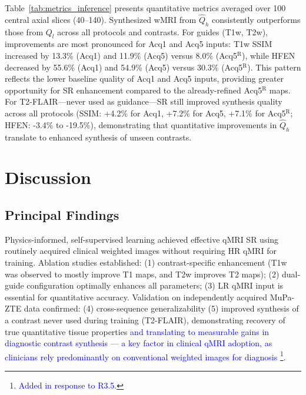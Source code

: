 \documentclass[journal,twoside,web]{ieeecolor}
\newcommand{\added}[1]{\textcolor{blue}{#1}}      %
\begin{document}
Table~\ref{tab:metrics_inference} presents quantitative metrics averaged over 100 central axial slices (40--140). Synthesized wMRI from $\hat{Q}_h$ consistently outperforms those from $Q_l$ across all protocols and contrasts. For guides (T1w, T2w), improvements are most pronounced for Acq1 and Acq5 inputs: T1w SSIM increased by 13.3\% (Acq1) and 11.9\% (Acq5) versus 8.0\% (Acq5$^{\text{R}}$), while HFEN decreased by 55.6\% (Acq1) and 54.9\% (Acq5) versus 30.3\% (Acq5$^{\text{R}}$). This pattern reflects the lower baseline quality of Acq1 and Acq5 inputs, providing greater opportunity for SR enhancement compared to the already-refined Acq5$^{\text{R}}$ maps. For T2-FLAIR—never used as guidance—SR still improved synthesis quality across all protocols (SSIM: +4.2\% for Acq1, +7.2\% for Acq5, +7.1\% for Acq5$^{\text{R}}$; HFEN: -3.4\% to -19.5\%), demonstrating that quantitative improvements in $\hat{Q}_h$ translate to enhanced synthesis of unseen contrasts.



\section{Discussion}
\subsection{ Principal Findings}
Physics-informed, self-supervised learning achieved effective qMRI SR using routinely acquired clinical weighted images without requiring HR qMRI for training. Ablation studies established: (1) contrast-specific enhancement (T1w was observed to mostly improve T1 maps, and T2w improves T2 maps); (2) dual-guide configuration optimally enhances all parameters; (3) LR qMRI input is essential for quantitative accuracy. Validation on independently acquired MuPa-ZTE data confirmed: (4) cross-sequence generalizability (5) improved synthesis of a contrast never used during training (T2-FLAIR), demonstrating recovery of true quantitative tissue properties \added{and translating to measurable gains in diagnostic contrast synthesis --- a key factor in 
clinical qMRI adoption, as clinicians rely predominantly on conventional 
weighted images for diagnosis \footnote{\textcolor{blue}{Added in response to R3.5.}}}.
\end{document}
